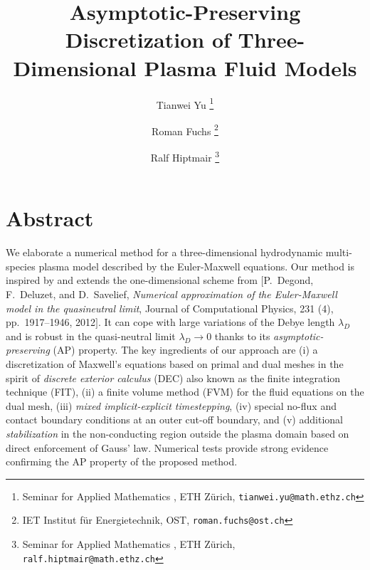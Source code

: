 \documentclass{article}
\title{Asymptotic-Preserving Discretization of Three-Dimensional Plasma Fluid Models}
\author[]{Tianwei Yu \thanks{Seminar for Applied Mathematics , ETH Z\"{u}rich, \texttt{tianwei.yu@math.ethz.ch}}}
\author[]{Roman Fuchs \thanks{IET Institut für Energietechnik, OST, \texttt{roman.fuchs@ost.ch}}}
\author[]{Ralf Hiptmair \thanks{Seminar for Applied Mathematics , ETH Z\"{u}rich, \texttt{ralf.hiptmair@math.ethz.ch}}}
\affil[]{}
\date{}
\newcommand{\todo}[1]{\textcolor{blue}{\fbox{\textbf{TODO: #1}}}}
\begin{document}
\maketitle

\section*{Abstract}

We elaborate a numerical method for a three-dimensional hydrodynamic multi-species plasma model described by the Euler-Maxwell equations. Our method is inspired by and extends the one-dimensional scheme from $[$P.~Degond, F.~Deluzet, and D.~Savelief, \emph{Numerical approximation of the Euler-Maxwell model in the quasineutral limit}, Journal of Computational Physics, 231 (4), pp.~1917--1946, 2012$]$. It can cope with large variations of the Debye length $\lambda_D$ and is robust in the quasi-neutral limit $\lambda_D\to 0$ thanks to its \emph{asymptotic-preserving} (AP) property. The key ingredients of our approach are (i) a discretization of Maxwell's equations based on primal and dual meshes in the spirit of \emph{discrete exterior calculus} (DEC) also known as the finite integration technique (FIT), (ii) a finite volume method (FVM) for the fluid equations on the dual mesh, (iii) \emph{mixed implicit-explicit timestepping}, (iv) special no-flux and contact boundary conditions at an outer cut-off boundary, and (v) additional \emph{stabilization} in the non-conducting region outside the plasma domain based on direct enforcement of Gauss' law. Numerical tests provide strong evidence confirming the AP property of the proposed method.



\end{document}
